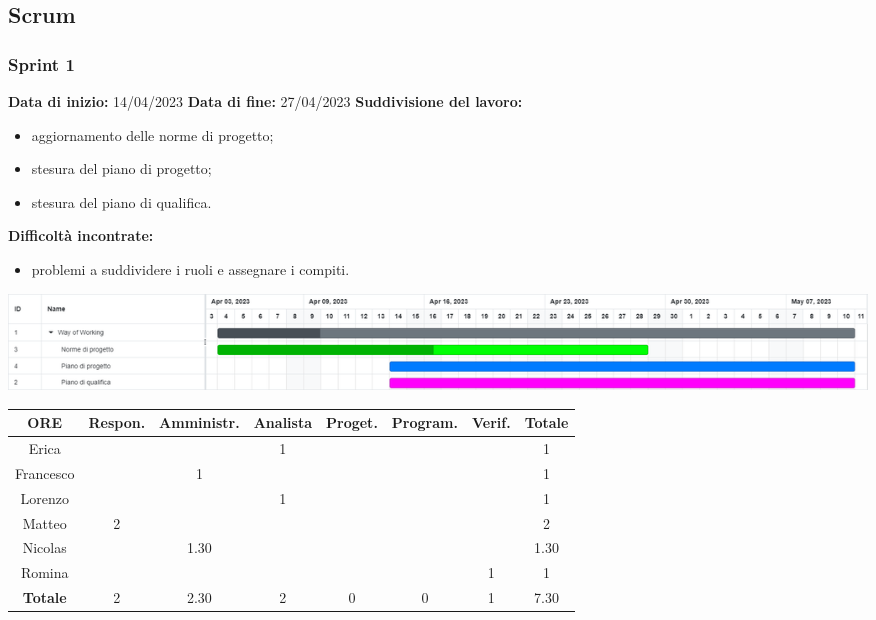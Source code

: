 \documentclass[a4paper, 12pt]{article}
\begin{document}
\subsection{Scrum}\label{Scrum}

\subsubsection{Sprint 1}
\textbf{Data di inizio:} 14/04/2023\newline
\textbf{Data di fine:} 27/04/2023\newline
\newline
\textbf{Suddivisione del lavoro:}
\begin{itemize}
    \item aggiornamento delle norme di progetto;
    \item stesura del piano di progetto;
    \item stesura del piano di qualifica.
\end{itemize}
\textbf{Difficoltà incontrate:}
\begin{itemize}
    \item problemi a suddividere i ruoli e assegnare i compiti.
\end{itemize}
\includegraphics[scale=0.24]{WoW_1.png}\newline
\newline
\begin{tabular}{|c|c|c|c|c|c|c|c|}
    \hline
    \textbf{ORE} & \textbf{Respon.} & \textbf{Amministr.} & \textbf{Analista} & \textbf{Proget.} & \textbf{Program.} & \textbf{Verif.} & \textbf{Totale}\\
    \hline
    Erica & & & 1 & & & & 1\\
    \hline
    Francesco & & 1 & & & & & 1\\
    \hline
    Lorenzo & & & 1 & & & & 1\\
    \hline
    Matteo & 2 & & & & & & 2\\
    \hline
    Nicolas & & 1.30 & & & & & 1.30\\
    \hline
    Romina & & & & & & 1 & 1\\
    \hline
    \textbf{Totale} & 2 & 2.30 & 2 & 0 & 0 & 1 & 7.30\\
    \hline
\end{tabular}\\[8pt]
\end{document}
